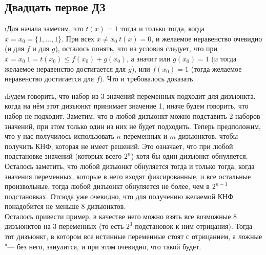 \subsection{Двадцать первое ДЗ}

\i Для начала заметим, что $t(x) = 1$ тогда и только тогда, когда $x = x_0 = \{1, \ldots, 1\}$. При всех $x \ne x_0\ t(x) = 0$, и желаемое неравенство очевидно (и для $f$ и для $g$), осталось понять, что из условия следует, что при $x=x_0\ 1 = t(x_0) \leq f(x_0) + g(x_0)$, а значит или $g(x_0) = 1$ (и тогда желаемое неравенство достигается для $g$), или $f(x_0) = 1$ (тогда желаемое неравенство достигается для $f$). Что и требовалось доказать.

\i Будем говорить, что набор из 3 значений переменных подходит для дизъюнкта, когда на нём этот дизъюнкт принимает значение 1, иначе будем говорить, что набор не подходит. Заметим, что в любой дизъюнкт можно подставить 2 наборов значений, при этом только один из них не будет подходить. Теперь предположим, что у нас получилось использовать $n$ переменных и $m$ дизъюнктов, чтобы получить КНФ, которая не имеет решений. Это означает, что при любой подстановке значений (которых всего $2^n$) хотя бы один дизъюнкт обнуляется. Осталось заметить, что любой дизъюнкт обнуляется тогда и только тогда, когда значения переменных, которые в него входят фиксированные, и все остальные произвольные, тогда любой дизъюнкт обнуляется не более, чем в $2^{n-3}$ подстановках. Отсюда уже очевидно, что для получению желаемой КНФ понадобится не меньше 8 дизъюнктов.\\
Осталось привести пример, в качестве него можно взять все возможные 8 дизъюнктов на 3 переменных (то есть $2^3$ подстановок к ним отрицания). Тогда тот дизъюнкт, в котором все истинные переменные стоят с отрицанием, а ложные "--- без него, занулится, и при этом очевидно, что такой будет.

